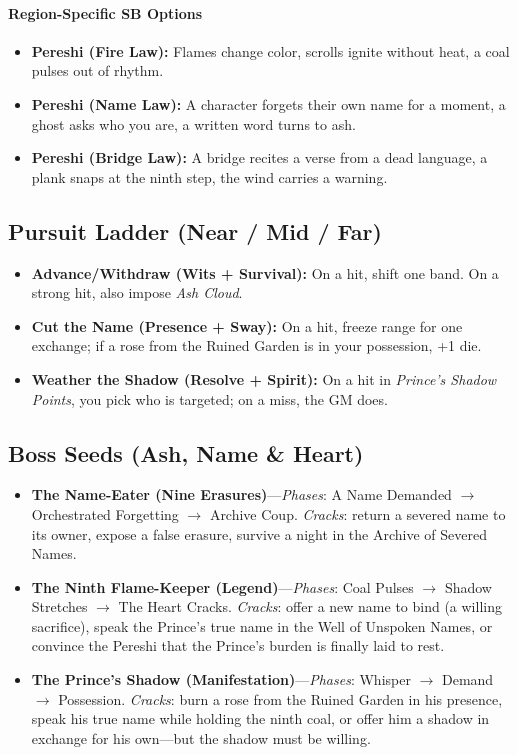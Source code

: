\paragraph{Region-Specific SB Options}
\begin{itemize}
\item \textbf{Pereshi (Fire Law):} Flames change color, scrolls ignite without heat, a coal pulses out of rhythm.
\item \textbf{Pereshi (Name Law):} A character forgets their own name for a moment, a ghost asks who you are, a written word turns to ash.
\item \textbf{Pereshi (Bridge Law):} A bridge recites a verse from a dead language, a plank snaps at the ninth step, the wind carries a warning.
\end{itemize}

\subsection*{Pursuit Ladder (Near / Mid / Far)}
\begin{itemize}
\item \textbf{Advance/Withdraw (Wits + Survival):} On a hit, shift one band. On a strong hit, also impose \emph{Ash Cloud}.
\item \textbf{Cut the Name (Presence + Sway):} On a hit, freeze range for one exchange; if a rose from the Ruined Garden is in your possession, +1 die.
\item \textbf{Weather the Shadow (Resolve + Spirit):} On a hit in \emph{Prince's Shadow Points}, you pick who is targeted; on a miss, the GM does.
\end{itemize}

\subsection*{Boss Seeds (Ash, Name \& Heart)}
\begin{itemize}
  \item \textbf{The Name-Eater (Nine Erasures)}---\emph{Phases}: A Name Demanded $\rightarrow$ Orchestrated Forgetting $\rightarrow$ Archive Coup. \emph{Cracks}: return a severed name to its owner, expose a false erasure, survive a night in the Archive of Severed Names.
  \item \textbf{The Ninth Flame-Keeper (Legend)}---\emph{Phases}: Coal Pulses $\rightarrow$ Shadow Stretches $\rightarrow$ The Heart Cracks. \emph{Cracks}: offer a new name to bind (a willing sacrifice), speak the Prince's true name in the Well of Unspoken Names, or convince the Pereshi that the Prince's burden is finally laid to rest.
  \item \textbf{The Prince's Shadow (Manifestation)}---\emph{Phases}: Whisper $\rightarrow$ Demand $\rightarrow$ Possession. \emph{Cracks}: burn a rose from the Ruined Garden in his presence, speak his true name while holding the ninth coal, or offer him a shadow in exchange for his own---but the shadow must be willing.
\end{itemize}

